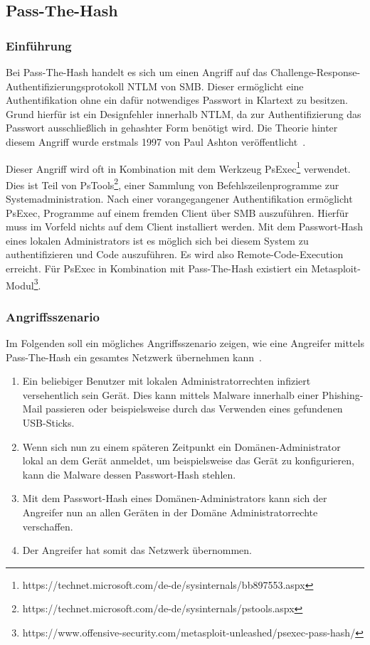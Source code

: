 \documentclass{AIFB_ITI_Crypto_Seminar}
\begin{document}
\subsection{Pass-The-Hash}
\subsubsection{Einführung}
Bei Pass-The-Hash handelt es sich um einen Angriff auf das Challenge-Response-Authentifizierungsprotokoll NTLM von SMB. Dieser ermöglicht eine Authentifikation ohne ein dafür notwendiges Passwort in Klartext zu besitzen. Grund hierfür ist ein Designfehler innerhalb NTLM, da zur Authentifizierung das Passwort ausschließlich in gehashter Form benötigt wird. Die Theorie hinter diesem Angriff wurde erstmals 1997 von Paul Ashton veröffentlicht~\cite{pth_discuss}.

Dieser Angriff wird oft in Kombination mit dem Werkzeug PsExec\footnote{https://technet.microsoft.com/de-de/sysinternals/bb897553.aspx} verwendet. Dies ist Teil von PsTools\footnote{https://technet.microsoft.com/de-de/sysinternals/pstools.aspx}, einer Sammlung von Befehlszeilenprogramme zur Systemadministration. Nach einer vorangegangener Authentifikation ermöglicht PsExec, Programme auf einem fremden Client über SMB auszuführen. Hierfür muss im Vorfeld nichts auf dem Client installiert werden. Mit dem Passwort-Hash eines lokalen Administrators ist es möglich sich bei diesem System zu authentifizieren und Code auszuführen. Es wird also Remote-Code-Execution erreicht. Für PsExec in Kombination mit Pass-The-Hash existiert ein Metasploit-Modul\footnote{https://www.offensive-security.com/metasploit-unleashed/psexec-pass-hash/}.

\subsubsection{Angriffsszenario}
Im Folgenden soll ein mögliches Angriffsszenario zeigen, wie eine Angreifer mittels Pass-The-Hash ein gesamtes Netzwerk übernehmen kann~\cite{pth_szenario}.
\begin{enumerate}
\item Ein beliebiger Benutzer mit lokalen Administratorrechten infiziert versehentlich sein Gerät. Dies kann mittels Malware innerhalb einer Phishing-Mail passieren oder beispielsweise durch das Verwenden eines gefundenen USB-Sticks.
\item Wenn sich nun zu einem späteren Zeitpunkt ein Domänen-Administrator lokal an dem Gerät anmeldet, um beispielsweise das Gerät zu konfigurieren, kann die Malware dessen Passwort-Hash stehlen.
\item Mit dem Passwort-Hash eines Domänen-Administrators kann sich der Angreifer nun an allen Geräten in der Domäne Administratorrechte verschaffen.
\item Der Angreifer hat somit das Netzwerk übernommen.
\end{enumerate}
\end{document}
